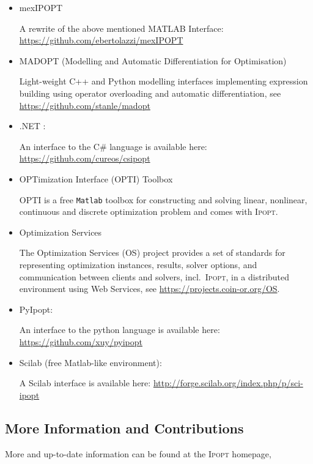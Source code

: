 \documentclass[10pt]{article}
\newcommand{\Ipopt}{\textsc{Ipopt}\xspace}
\begin{document}
\begin{itemize}
\item mexIPOPT

  A rewrite of the above mentioned MATLAB Interface:
  \url{https://github.com/ebertolazzi/mexIPOPT}

\item MADOPT (Modelling and Automatic Differentiation for Optimisation)

  Light-weight C++ and Python modelling interfaces implementing
  expression building using operator overloading and automatic differentiation, see
  \url{https://github.com/stanle/madopt}

\item .NET :
  
  An interface to the C\# language is available here: 
  \url{https://github.com/cureos/csipopt}
  
\item OPTimization Interface (OPTI) Toolbox

  OPTI is a free {\tt Matlab} toolbox for constructing and solving linear, 
  nonlinear, continuous and discrete optimization problem and comes with 
  \Ipopt.

\item Optimization Services

  The Optimization Services (OS) project provides a set of standards 
  for representing optimization instances, results, solver options, 
  and communication between clients and solvers, incl.\ \Ipopt, in a 
  distributed environment using Web Services, see
  \url{https://projects.coin-or.org/OS}.

\item PyIpopt:

  An interface to the python language is available here: 
  \url{https://github.com/xuy/pyipopt}
    
\item Scilab (free Matlab-like environment):


  A Scilab interface is available here: 
  \url{http://forge.scilab.org/index.php/p/sci-ipopt}
\end{itemize}

\subsection{More Information and Contributions}
More and up-to-date information can be found at the \Ipopt homepage,
\end{document}

